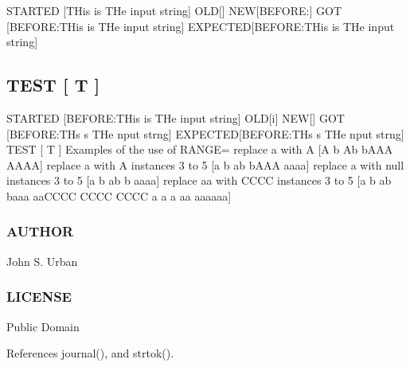 S\+T\+A\+R\+T\+ED \mbox{[}T\+His is T\+He input string\mbox{]} O\+LD\mbox{[}\mbox{]} N\+EW\mbox{[}B\+E\+F\+O\+RE\+:\mbox{]} G\+OT \mbox{[}B\+E\+F\+O\+RE\+:T\+His is T\+He input string\mbox{]} E\+X\+P\+E\+C\+T\+ED\mbox{[}B\+E\+F\+O\+RE\+:T\+His is T\+He input string\mbox{]} \subsection*{T\+E\+ST \mbox{[} T \mbox{]} }

S\+T\+A\+R\+T\+ED \mbox{[}B\+E\+F\+O\+RE\+:T\+His is T\+He input string\mbox{]} O\+LD\mbox{[}i\mbox{]} N\+EW\mbox{[}\mbox{]} G\+OT \mbox{[}B\+E\+F\+O\+RE\+:T\+Hs s T\+He nput strng\mbox{]} E\+X\+P\+E\+C\+T\+ED\mbox{[}B\+E\+F\+O\+RE\+:T\+Hs s T\+He nput strng\mbox{]} T\+E\+ST \mbox{[} T \mbox{]} Examples of the use of R\+A\+N\+GE= replace a with A \mbox{[}A b Ab b\+A\+AA A\+A\+AA\mbox{]} replace a with A instances 3 to 5 \mbox{[}a b ab b\+A\+AA aaaa\mbox{]} replace a with null instances 3 to 5 \mbox{[}a b ab b aaaa\mbox{]} replace aa with C\+C\+CC instances 3 to 5 \mbox{[}a b ab baaa aa\+C\+C\+CC C\+C\+CC C\+C\+CC a a a aa aaaaaa\mbox{]}

\subsubsection*{A\+U\+T\+H\+OR}

John S. Urban \subsubsection*{L\+I\+C\+E\+N\+SE}

Public Domain 

References journal(), and strtok().

